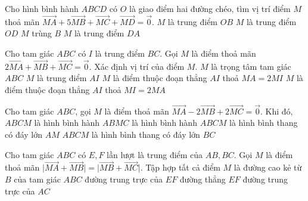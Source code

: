 \begin{ex}%
	Cho hình bình hành $ABCD$ có $O$ là giao điểm hai đường chéo, tìm vị trí điểm $M$ thoả mãn $\vec{MA}+5\vec{MB}+\vec{MC}+\vec{MD}=\vec{0}$.
	\choice
	{\True $M$ là trung điểm $OB$}
	{$M$ là trung điểm $OD$}
	{$M$ trùng $B$}
	{$M$ là trung điểm $DA$}
\end{ex}

\begin{ex}%
	Cho tam giác $ABC$ có $I$ là trung điểm $BC$. Gọi $M$ là điểm thoả mãn $2\vec{MA}+\vec{MB}+\vec{MC}=\vec{0}$. Xác định vị trí của điểm $M$.
	\choice
	{$M$ là trọng tâm tam giác $ABC$}
	{\True $M$ là trung điểm $AI$}
	{$M$ là điểm thuộc đoạn thẳng $AI$ thoả $MA=2MI$}
	{$M$ là điểm thuộc đoạn thẳng $AI$ thoả $MI=2MA$}
\end{ex}

\begin{ex}%
	Cho tam giác $ABC$, gọi $M$ là điểm thoả mãn $\vec{MA}-2\vec{MB}+2\vec{MC}=\vec{0}$. Khi đó,
	\choice
	{$ABCM$ là hình bình hành}
	{$ABMC$ là hình bình hành}
	{\True $ABCM$ là hình bình thang có đáy lớn $AM$}
	{$ABCM$ là hình bình thang có đáy lớn $BC$}
\end{ex}

\begin{ex}%
	Cho tam giác $ABC$ có $E, F$ lần lượt là trung điểm của $AB, BC$. Gọi $M$ là điểm thoả mãn $\Big|\vec{MA}+\vec{MB}\Big|=\Big|\vec{MB}+\vec{MC}\Big|$. Tập hợp tất cả điểm $M$ là
	\choice
	{đường cao kẻ từ $B$ của tam giác $ABC$}
	{\True đường trung trực của $EF$}
	{đường thẳng $EF$}
	{đường trung trực của $AC$}
\end{ex}

